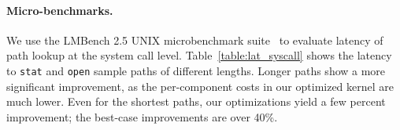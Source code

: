 \paragraph{Micro-benchmarks.}
We use the LMBench 2.5 UNIX microbenchmark suite~\cite{McVoy:lmbench}
to evaluate latency of path lookup at the system call level.
Table~\ref{table:lat_syscall} shows the latency to 
{\tt stat} and {\tt open} sample paths of different lengths.
Longer paths show a more significant improvement, as the per-component costs in our
optimized kernel are much lower.
Even for the shortest paths, our optimizations yield a few percent improvement;
the best-case improvements are over 40\%.

